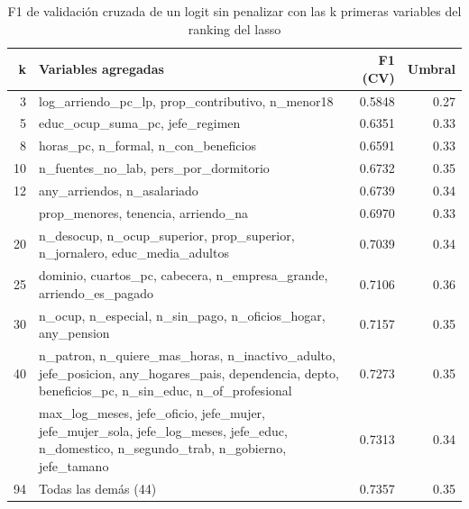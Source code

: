 \begin{table}

\caption{\label{tab:logit_parsimonia}F1 de validación cruzada de un logit sin penalizar con las k primeras variables del ranking del lasso}
\centering
\begin{tabular}[t]{rp{9cm}rr}
\toprule
k & Variables agregadas & F1 (CV) & Umbral\\
\midrule
3 & log\_arriendo\_pc\_lp, prop\_contributivo, n\_menor18 & 0.5848 & 0.27\\
5 & educ\_ocup\_suma\_pc, jefe\_regimen & 0.6351 & 0.33\\
8 & horas\_pc, n\_formal, n\_con\_beneficios & 0.6591 & 0.33\\
10 & n\_fuentes\_no\_lab, pers\_por\_dormitorio & 0.6732 & 0.35\\
12 & any\_arriendos, n\_asalariado & 0.6739 & 0.34\\
\addlinespace
15 & prop\_menores, tenencia, arriendo\_na & 0.6970 & 0.33\\
20 & n\_desocup, n\_ocup\_superior, prop\_superior, n\_jornalero, educ\_media\_adultos & 0.7039 & 0.34\\
25 & dominio, cuartos\_pc, cabecera, n\_empresa\_grande, arriendo\_es\_pagado & 0.7106 & 0.36\\
30 & n\_ocup, n\_especial, n\_sin\_pago, n\_oficios\_hogar, any\_pension & 0.7157 & 0.35\\
40 & n\_patron, n\_quiere\_mas\_horas, n\_inactivo\_adulto, jefe\_posicion, any\_hogares\_pais, dependencia, depto, beneficios\_pc, n\_sin\_educ, n\_of\_profesional & 0.7273 & 0.35\\
\addlinespace
50 & max\_log\_meses, jefe\_oficio, jefe\_mujer, jefe\_mujer\_sola, jefe\_log\_meses, jefe\_educ, n\_domestico, n\_segundo\_trab, n\_gobierno, jefe\_tamano & 0.7313 & 0.34\\
94 & Todas las demás (44) & 0.7357 & 0.35\\
\bottomrule
\end{tabular}
\end{table}
